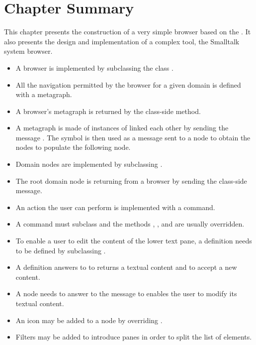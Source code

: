 \documentclass[a4paper,10pt,twoside]{book}
\begin{document}

\section{Chapter Summary}

This chapter presents the construction of a very simple browser based on the \obf. It also presents the design and implementation of a complex tool, the Smalltalk system browser.

\begin{itemize}
\item A browser is implemented by subclassing the class .
\item All the navigation permitted by the browser for a given domain is defined with a metagraph.
\item A browser's metagraph is returned by the  class-side method.
\item A metagraph is made of instances of  linked each other by sending the message . The symbol  is then used as a message sent to a node to obtain the nodes to populate the following node.
\item Domain nodes are implemented by subclassing .
\item The root domain node is returning from a browser by sending the  class-side message.
\item An action the user can perform is implemented with a command.
\item A command must subclass  and the methods , ,  and  are usually overridden.
\item To enable a user to edit the content of the lower text pane, a definition needs to be defined by subclassing .
\item A definition answers to  to returns a textual content and  to accept a new content.
\item A node needs to answer to the  message to enables the user to modify its textual content.
\item An icon may be added to a node by overriding .
\item Filters may be added to introduce panes in order to split the list of elements.
\end{itemize}
\end{document}
